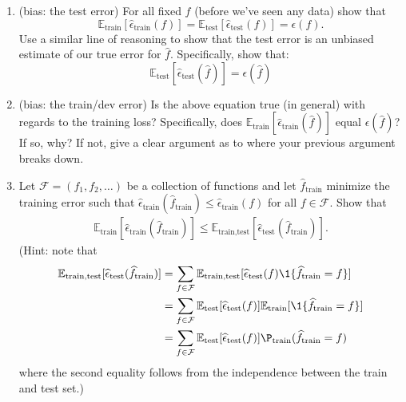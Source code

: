 \documentclass{article}
\begin{document}
\begin{bprob}
    \begin{enumerate}
        \item {} (bias: the test error) For all fixed $f$ (before we've seen any data) show that
        \[
        \mathbb{E}_{\textrm{train}}[ \widehat{\epsilon}_{\textrm{train}}(f) ] = \mathbb{E}_{\textrm{test}}[ \widehat{\epsilon}_{\textrm{test}}(f) ] = \epsilon(f).
        \]
        Use a similar line of reasoning to show that the test error is an unbiased estimate of our true error for $\hat{f}$. Specifically, show that:
        \[
          \mathbb{E}_{\textrm{test}}[\widehat{\epsilon}_{\textrm{test}}(\widehat{f})] = \epsilon(\widehat{f})
        \]
        \item {} (bias: the train/dev error) Is the above equation true (in general) with regards to the training loss? Specifically, does $\mathbb{E}_{\textrm{train}}[\widehat{\epsilon}_{\textrm{train}}(\widehat{f})]$ equal $\epsilon(\widehat{f})$? If so, why? If not, give a clear argument as to where your previous argument breaks down.
        \item {} Let $\mathcal{F} = (f_1, f_2,\dots)$ be a collection of functions and let $\widehat{f}_{\textrm{train}}$ minimize the training error such that $\widehat{\epsilon}_{\textrm{train}}(\widehat{f}_{\textrm{train}}) \leq \widehat{\epsilon}_{\textrm{train}}(f)$ for all $f \in \mathcal{F}$.
        Show that
        \begin{align*}
            \mathbb{E}_{\text{train}}[ \widehat{\epsilon}_{\textrm{train}}(\widehat{f}_{\textrm{train}}) ] \leq \mathbb{E}_{\text{train,test}}[ \widehat{\epsilon}_{\textrm{test}}(\widehat{f}_{\textrm{train}}) ].
        \end{align*}
        (Hint: note that
        \begin{align*}
            \mathbb{E}_{\text{train,test}}[ \widehat{\epsilon}_{\textrm{test}}(\widehat{f}_{\textrm{train}}) ] &= \sum_{f \in \mathcal{F}} \mathbb{E}_{\text{train,test}}[ \widehat{\epsilon}_{\textrm{test}}(f) \1\{ \widehat{f}_{\textrm{train}} = f\}] \\
            &= \sum_{f \in \mathcal{F}} \mathbb{E}_{\text{test}}[ \widehat{\epsilon}_{\textrm{test}}(f) ] \mathbb{E}_{\text{train}}[ \1\{\widehat{f}_{\textrm{train}} = f \}]\\
            &= \sum_{f \in \mathcal{F}} \mathbb{E}_{\text{test}}[ \widehat{\epsilon}_{\textrm{test}}(f) ] \P_{\text{train}}(\widehat{f}_{\textrm{train}} = f )
        \end{align*}
        where the second equality follows from the independence between the train and test set.)
        \newline
    \end{enumerate}

\end{bprob}
\end{document}
